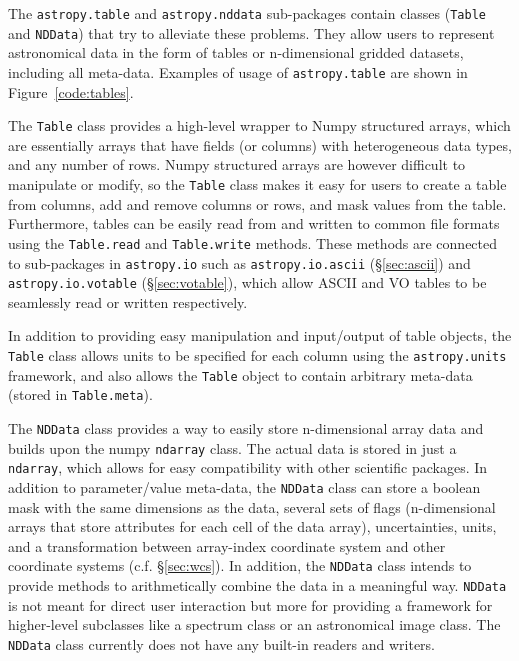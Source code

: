 \documentclass[traditabstract]{aa}
\begin{document}
The \texttt{astropy.table} and \texttt{astropy.nddata} sub-packages contain
classes (\texttt{Table} and \texttt{NDData}) that try to alleviate these
problems. They allow users to represent astronomical data in the form of
tables or n-dimensional gridded datasets, including all meta-data. Examples of
usage of \texttt{astropy.table} are shown in Figure~\ref{code:tables}.

The \texttt{Table} class provides a high-level wrapper to Numpy structured
arrays, which are essentially arrays that have fields (or columns) with
heterogeneous data types, and any number of rows. Numpy structured arrays are
however difficult to manipulate or modify, so the \texttt{Table} class makes
it easy for users to create a table from columns, add and remove columns or rows,
and mask values from the table. Furthermore, tables can be easily read from and written to
common file formats using the \texttt{Table.read} and
\texttt{Table.write} methods. These methods are connected to sub-packages in \texttt{astropy.io} such as \texttt{astropy.io.ascii} (\S\ref{sec:ascii}) and \texttt{astropy.io.votable} (\S\ref{sec:votable}), which allow ASCII and VO tables to be seamlessly read or written respectively.

In addition to providing easy manipulation and
input/output of table objects, the \texttt{Table} class allows units to be
specified for each column using the \texttt{astropy.units} framework, and also
allows the \texttt{Table} object to contain arbitrary meta-data (stored in
\texttt{Table.meta}).

The \texttt{NDData} class provides a way to easily store n-dimensional array
data and builds upon the \gls{numpy} \texttt{ndarray} class. The actual data
is stored in just a \texttt{ndarray}, which allows for easy compatibility with
other scientific packages. In addition to parameter/value meta-data, the
\texttt{NDData} class can store a boolean mask with the same dimensions as the
data, several sets of flags (n-dimensional arrays that store attributes for
each cell of the data array), uncertainties, units, and a transformation
between array-index coordinate system and other coordinate systems (c.f.
\S\ref{sec:wcs}). In addition, the \texttt{NDData} class intends to provide
methods to arithmetically combine the data in a meaningful way.
\texttt{NDData} is not meant for direct user interaction but more for
providing a framework for higher-level subclasses like a spectrum class or an
astronomical image class. The \texttt{NDData} class currently does not have
any built-in readers and writers.
\end{document}
